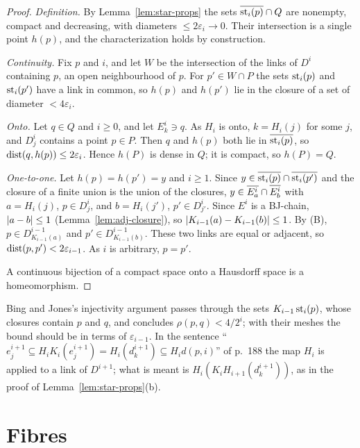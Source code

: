 \begin{proof}
\emph{Definition.} By Lemma~\ref{lem:star-props} the sets $\overline{\operatorname{st}_i(p)}\cap Q$ are nonempty, compact and decreasing, with diameters $\le2\varepsilon_i\to0$. Their intersection is
a single point $h(p)$, and the characterization holds by construction.

\emph{Continuity.} Fix $p$ and $i$, and let $W$ be the intersection of the links of $D^i$ containing $p$, an open neighbourhood of $p$. For $p'\in W\cap P$ the sets $\operatorname{st}_i(p)$ and
$\operatorname{st}_i(p')$ have a link in common, so $h(p)$ and $h(p')$ lie in the closure of a set of diameter $<4\varepsilon_i$.

\emph{Onto.} Let $q\in Q$ and $i\ge0$, and let $E^i_k\ni q$. As $H_i$ is onto, $k=H_i(j)$ for some $j$, and $D^i_j$ contains a point $p\in P$. Then $q$ and $h(p)$ both lie in
$\overline{\operatorname{st}_i(p)}$, so $\operatorname{dist}(q,h(p))\le2\varepsilon_i$. Hence $h(P)$ is dense in $Q$; it is compact, so $h(P)=Q$.

\emph{One-to-one.} Let $h(p)=h(p')=y$ and $i\ge1$. Since $y\in\overline{\operatorname{st}_i(p)}\cap\overline{\operatorname{st}_i(p')}$ and the closure of a finite union is the union of the closures, $y\in\overline{E^i_a}\cap
\overline{E^i_b}$ with $a=H_i(j)$, $p\in D^i_j$, and $b=H_i(j')$, $p'\in D^i_{j'}$. Since $E^i$ is a BJ-chain, $\left\lvert a-b\right\rvert\le1$ (Lemma~\ref{lem:adj-closure}), so $\left\lvert K_{i-1}(a)-K_{i-1}(b)\right\rvert\le1$.
By (B), $p\in D^{i-1}_{K_{i-1}(a)}$ and $p'\in D^{i-1}_{K_{i-1}(b)}$. These two links are equal or adjacent, so $\operatorname{dist}(p,p')<2\varepsilon_{i-1}$. As $i$ is arbitrary, $p=p'$.

A continuous bijection of a compact space onto a Hausdorff space is a homeomorphism.
\end{proof}


\begin{remark}
Bing and Jones's injectivity argument passes through the sets $K_{i-1}\operatorname{st}_i(p)$, whose closures contain $p$ and $q$, and concludes $\rho(p,q)<4/2^i$; with their meshes the bound
should be in terms of $\varepsilon_{i-1}$. In the sentence ``$e_j^{i+1}\subseteq H_iK_i(e_j^{i+1})=H_i(d^{i+1}_k)\subseteq H_id(p,i)$'' of p.~188 the map $H_i$ is applied to a link
of $D^{i+1}$; what is meant is $H_i(K_iH_{i+1}(d^{i+1}_k))$, as in the proof of Lemma~\ref{lem:star-props}(b).
\end{remark}

\section{Fibres}


